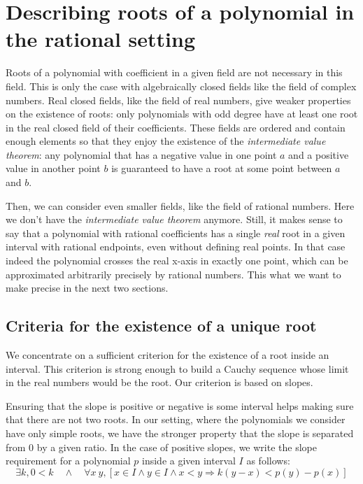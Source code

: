 \documentclass{mscs}
\begin{document}
\section{Describing roots of a polynomial in the rational setting}
\label{sec:rational}

Roots of a polynomial with coefficient in a given field are not
necessary in this field. This is only  the case with algebraically
closed fields like the field of complex numbers.
Real closed fields, like the field of real numbers, give weaker
properties on the existence of roots: only polynomials with odd degree
have at least one root in the real closed field of their coefficients.
These fields are ordered and contain enough elements
so that they enjoy the existence of the {\em intermediate value theorem}:
any polynomial that has a negative value in one point \(a\) and a positive value
in another point \(b\) is guaranteed to have a root at some point between
\(a\) and \(b\).

Then, we can consider even smaller fields, like the field of rational numbers.
Here we don't have the {\em intermediate value theorem}
anymore. Still, it makes sense to say that a polynomial with rational
coefficients has a single \emph{real} root in a given interval with rational
endpoints, even without defining real points. In that case indeed the
polynomial crosses the real x-axis in exactly one point, which
can be approximated arbitrarily precisely by rational numbers.
This what we want to make precise in the next two sections.

\subsection{Criteria for the existence of a unique root}
We concentrate on a sufficient criterion for the existence of a root
inside an interval.  This criterion is strong enough to build a Cauchy
sequence whose limit in the real numbers would be the root.  Our
criterion is based on slopes.

Ensuring that the slope is positive or negative is some interval helps
making sure that there are not two roots.  In our setting, where the
polynomials we consider have only simple roots, we have the stronger
property that the slope is separated from 0 by a given ratio.  In the
case of positive slopes, we write the slope requirement for a
polynomial \(p\) inside a given interval \(I\) as follows:
\[\exists k, 0 < k \quad \wedge \quad \forall x\ y, [x \in I \wedge y \in I
\wedge x < y \Rightarrow k(y - x) < p(y) - p (x)] \]
\end{document}
